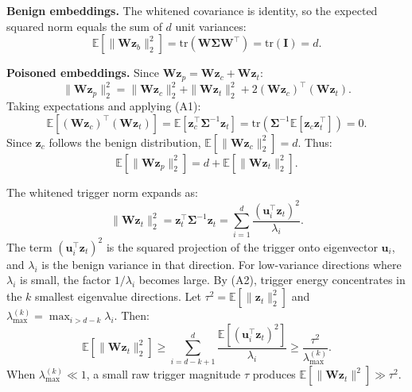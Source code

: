 \documentclass[letterpaper,twocolumn,10pt]{article}
\newcommand{\mn}[1]{\textcolor{orange!90!black}{Mahmoud: #1}}
\begin{document}
\par \textbf{Benign embeddings.} The whitened covariance is identity, so the expected squared norm equals the sum of $d$ unit variances:
\begin{equation}
\mathbb{E}[\|\mathbf{W}\mathbf{z}_b\|_2^2] = \mathrm{tr}(\mathbf{W}\bm{\Sigma} \mathbf{W}^\top) = \mathrm{tr}(\mathbf{I}) = d.
\end{equation}

\par \textbf{Poisoned embeddings.} Since $\mathbf{W}\mathbf{z}_p = \mathbf{W}\mathbf{z}_c + \mathbf{W}\mathbf{z}_t$:
\begin{equation}
\|\mathbf{W}\mathbf{z}_p\|_2^2 = \|\mathbf{W}\mathbf{z}_c\|_2^2 + \|\mathbf{W}\mathbf{z}_t\|_2^2 + 2(\mathbf{W}\mathbf{z}_c)^\top(\mathbf{W}\mathbf{z}_t).
\end{equation}
Taking expectations and applying (A1):
\begin{equation}
\mathbb{E}[(\mathbf{W}\mathbf{z}_c)^\top(\mathbf{W}\mathbf{z}_t)] = \mathbb{E}[\mathbf{z}_c^\top \bm{\Sigma}^{-1} \mathbf{z}_t] = \mathrm{tr}(\bm{\Sigma}^{-1}\mathbb{E}[\mathbf{z}_c \mathbf{z}_t^\top]) = 0.
\end{equation}
Since $\mathbf{z}_c$ follows the benign distribution, $\mathbb{E}[\|\mathbf{W}\mathbf{z}_c\|_2^2] = d$. Thus:
\begin{equation}
\mathbb{E}[\|\mathbf{W}\mathbf{z}_p\|_2^2] = d + \mathbb{E}[\|\mathbf{W}\mathbf{z}_t\|_2^2].
\end{equation}


The whitened trigger norm expands as:
\begin{equation}
\|\mathbf{W}\mathbf{z}_t\|_2^2 = \mathbf{z}_t^\top \bm{\Sigma}^{-1} \mathbf{z}_t = \sum_{i=1}^{d} \frac{(\mathbf{u}_i^\top \mathbf{z}_t)^2}{\lambda_i}.
\end{equation}
The term $(\mathbf{u}_i^\top \mathbf{z}_t)^2$ is the squared projection of the trigger onto eigenvector $\mathbf{u}_i$, and $\lambda_i$ is the benign variance in that direction. For low-variance directions where $\lambda_i$ is small, the factor $1/\lambda_i$ becomes large. By (A2), trigger energy concentrates in the $k$ smallest eigenvalue directions. Let $\tau^2 = \mathbb{E}[\|\mathbf{z}_t\|_2^2]$ and $\lambda_{\max}^{(k)} = \max_{i > d-k} \lambda_i$. Then:
\begin{equation}
\mathbb{E}[\|\mathbf{W}\mathbf{z}_t\|_2^2] \ge \sum_{i=d-k+1}^{d} \frac{\mathbb{E}[(\mathbf{u}_i^\top \mathbf{z}_t)^2]}{\lambda_i} \geq \frac{\tau^2}{\lambda_{\max}^{(k)}}.
\end{equation}
When $\lambda_{\max}^{(k)} \ll 1$, a small raw trigger magnitude $\tau$ produces $\mathbb{E}[\|\mathbf{W}\mathbf{z}_t\|^2] \gg \tau^2$.
\end{document}
